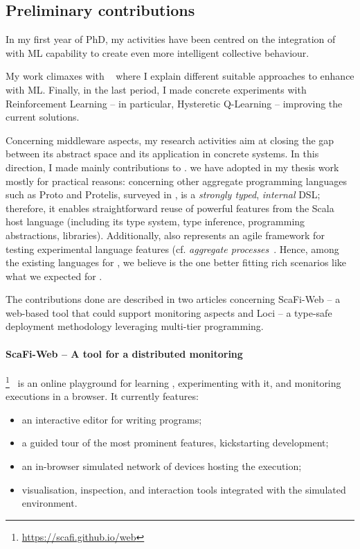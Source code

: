 \documentclass[11pt]{article}
\begin{document}
\subsection{Preliminary contributions}
In my first year of PhD, my activities have been centred on
the integration of \ac{} with ML capability to create even more
intelligent collective behaviour. 

My work climaxes with ~\cite{research} where I explain different suitable approaches to
enhance \ac{} with ML. Finally, in the last period, I made concrete
experiments with Reinforcement Learning -- in particular, Hysteretic Q-Learning \cite{hysteretic-q} -- improving the current \ac{} solutions.

Concerning middleware aspects, my research activities aim at closing the gap between
its abstract space and its application in concrete systems. In this direction, I made mainly contributions to \scafi.
%
we have adopted \scafi{} in my thesis work mostly for practical reasons: concerning other aggregate programming languages such as Proto and Protelis, surveyed in \cite{viroli2019jlamp-si-coord},
%
\scafi{} is a \emph{strongly typed}, \emph{internal} DSL; therefore, it enables straightforward reuse of powerful features from the Scala host language (including its type system, type inference, programming abstractions, libraries).
%
Additionally, \scafi{} also represents an agile framework for testing experimental language features (cf. \emph{aggregate processes}~\cite{DBLP:journals/eaai/CasadeiVAPD21}.
%
Hence, among the existing languages for \ac{}, we believe \scafi{} is the one better fitting rich scenarios like what we expected for \cpsw{}.

The contributions done are described in two articles concerning ScaFi-Web -- a web-based tool that could support monitoring aspects and \scafi Loci -- a type-safe deployment methodology leveraging multi-tier programming.
\paragraph{ScaFi-Web -- A tool for a distributed monitoring} \label{scafi-web}
\scafiweb{}\footnote{\url{https://scafi.github.io/web}}~\cite{DBLP:conf/coordination/AguzziCMPV21}
 is an online playground for learning \ac{}, experimenting with it, and monitoring executions in a browser.
It currently features:
\begin{itemize}
 \item an interactive editor for writing \scafi{} programs;
 \item a guided tour of the most prominent features, kickstarting development;
 \item an in-browser simulated network of devices hosting the execution;
 \item visualisation, inspection, and interaction tools integrated with the simulated environment.
\end{itemize}
\end{document}
